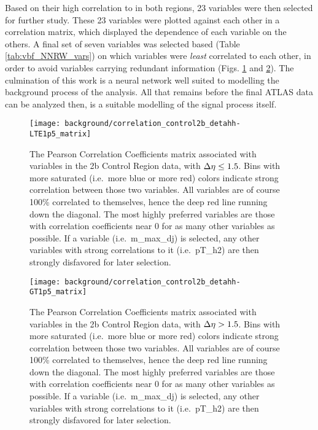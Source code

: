     Based on their high correlation to \mhh in both \deta regions, 23 variables were then selected for further study.
    These 23 variables were plotted against each other in a correlation matrix,
        which displayed the dependence of each variable on the others.
    A final set of seven variables was selected based (Table \ref{tab:vbf_NNRW_vars}) on which variables were \textit{least} correlated to each other,
        in order to avoid variables carrying redundant information (Figs. \ref{fig:vbf_corr_matrix_LT1.5} and \ref{fig:vbf_corr_matrix_GT1.5}).
    The culmination of this work is a neural network well suited to modelling the background process of the analysis.
    All that remains before the final ATLAS data can be analyzed then,
        is a suitable modelling of the signal process itself.

    \begin{figure}[tbh]
        \texttt{[image: background/correlation\_control2b\_detahh-LTE1p5\_matrix]}
        \caption{
            The Pearson Correlation Coefficients matrix associated with variables in the 2b Control Region data,
                with $\Delta \eta \leq 1.5$.
            Bins with more saturated (i.e.\ more blue or more red) colors indicate strong correlation between those two variables.
            All variables are of course 100\% correlated to themselves, hence the deep red line running down the diagonal.
            The most highly preferred variables are those with correlation coefficients near 0 for as many other variables as possible.
            If a variable (i.e.\ m\_max\_dj) is selected, any other variables with strong correlations to it (i.e.\ pT\_h2)
                are then strongly disfavored for later selection.
        }
        \label{fig:vbf_corr_matrix_LT1.5}
    \end{figure}

    \begin{figure}[tbh]
        \texttt{[image: background/correlation\_control2b\_detahh-GT1p5\_matrix]}
        \caption{
            The Pearson Correlation Coefficients matrix associated with variables in the 2b Control Region data,
                with $\Delta \eta > 1.5$.
            Bins with more saturated (i.e.\ more blue or more red) colors indicate strong correlation between those two variables.
            All variables are of course 100\% correlated to themselves, hence the deep red line running down the diagonal.
            The most highly preferred variables are those with correlation coefficients near 0 for as many other variables as possible.
            If a variable (i.e.\ m\_max\_dj) is selected, any other variables with strong correlations to it (i.e.\ pT\_h2)
                are then strongly disfavored for later selection.
        }
        \label{fig:vbf_corr_matrix_GT1.5}
    \end{figure}



